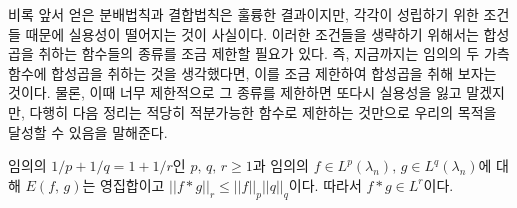 비록 앞서 얻은 분배법칙과 결합법칙은 훌륭한 결과이지만, 각각이 성립하기 위한 조건들 때문에 실용성이 떨어지는 것이 사실이다. 이러한 조건들을 생략하기 위해서는 합성곱을 취하는 함수들의 종류를 조금 제한할 필요가 있다. 즉, 지금까지는 임의의 두 가측함수에 합성곱을 취하는 것을 생각했다면, 이를 조금 제한하여 합성곱을 취해 보자는 것이다. 물론, 이때 너무 제한적으로 그 종류를 제한하면 또다시 실용성을 잃고 말겠지만, 다행히 다음 정리는 적당히 적분가능한 함수로 제한하는 것만으로 우리의 목적을 달성할 수 있음을 말해준다.

\begin{theorem}
    임의의 $1/p+1/q=1+1/r$인 $p,\,q,\,r\geq1$과 임의의 $f\in L^p(\lambda_n),\,g\in L^q(\lambda_n)$에 대해 $E(f,\,g)$는 영집합이고 $||f*g||_r\leq||f||_p||q||_q$이다. 따라서 $f*g\in L^r$이다.
\end{theorem}

